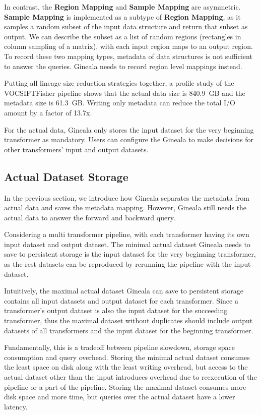 \documentclass{sig-alternate}
\begin{document}
In contrast, the {\bf Region Mapping} and {\bf Sample Mapping} are asymmetric. 
{\bf Sample Mapping} is implemented as a subtype of {\bf Region Mapping}, as it samples a random subset of the input data structure and return that subset as output.
We can describe the subset as a list of random regions (rectangles in column sampling of a matrix), with each input region maps to an output region.
To record these two mapping types, metadata of data structures is not sufficient to answer the queries. 
Gineala needs to record region level mappings instead.

Putting all lineage size reduction strategies together, 
a profile study of the VOCSIFTFisher pipeline shows that the actual data size is 840.9~GB and the metadata size is 61.3~GB. 
Writing only metadata can reduce the total I/O amount by a factor of 13.7x.

For the actual data, Gineala only stores the input dataset for the very beginning transformer as mandatory. 
Users can configure the Gineala to make decisions for other transformers' input and output datasets.




\subsection{Actual Dataset Storage}
In the previous section, we introduce how Gineala separates the metadata from actual data and saves the metadata mapping.
However, Gineala still needs the actual data to answer the forward and backward query.

Considering a multi transformer pipeline, with each transformer having its own input dataset and output dataset.
The minimal actual dataset Gineala needs to save to persistent storage is the input dataset for the very beginning transformer, as
the rest datasets can be reproduced by rerunning the pipeline with the input dataset.

Intuitively, the maximal actual dataset Gineala can save to persistent storage contains all input datasets and output dataset for each transformer.
Since a transformer's output dataset is also the input dataset for the succeeding transformer, thus the maximal dataset without duplicates
should include output datasets of all transformers and the input dataset for the beginning transformer. 

Fundamentally, this is a tradeoff between pipeline slowdown, storage space consumption and query overhead. 
Storing the minimal actual dataset consumes the least space on disk along with the least writing overhead, 
but access to the actual dataset other than the input introduces overhead due to reexecution of the pipeline or a part of the pipeline.
Storing the maximal dataset consumes more disk space and more time, but queries over the actual dataset
have a lower latency.
\end{document}
